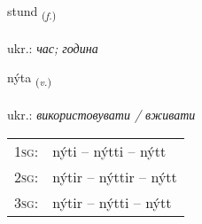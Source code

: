 \documentclass[frontgrid, backgrid]{flacards}\usepackage[]{graphicx}\usepackage[]{xcolor}
\begin{document}
\renewcommand{\flhead}{\vskip5pt \fboxsep=0pt {\small\bfseries\footnotesize Nafnorð | іменник}}
\renewcommand{\fcfoot}{\vskip5pt \fboxsep=0pt \hspace{2pt}{\small\bfseries\footnotesize 1K}}

\renewcommand{\blhead}{\vskip5pt {\small\bfseries\footnotesize Nafnorð | іменник }}
\renewcommand{\bcfoot}{\vskip5pt \hspace{2pt}{\small\bfseries\footnotesize 1K}}


{stund \small{\textsubscript{(\textit{f.})}} \\[1ex] %
\textphonetic{[stʏnt]} \\
ukr.: \emph{час; година} \\  [2ex]
\renewcommand*{\arraystretch}{0.8}
}

\renewcommand{\flhead}{\vskip5pt \fboxsep=0pt {\small\bfseries\footnotesize Sagnorð | дієслово}}
\renewcommand{\fcfoot}{\vskip5pt \fboxsep=0pt \hspace{2pt}{\small\bfseries\footnotesize 1K}}

\renewcommand{\blhead}{\vskip5pt {\small\bfseries\footnotesize Sagnorð | дієслово }}
\renewcommand{\bcfoot}{\vskip5pt \hspace{2pt}{\small\bfseries\footnotesize 1K}}


{nýta \small{\textsubscript{(\textit{v.})}} \\[1ex] %
\textphonetic{[niːta]} \\
ukr.: \emph{використовувати / вживати} \\  [2ex]
\renewcommand*{\arraystretch}{0.8}
\begin{tabular}{p{1cm}l}
\textsc{1sg}: & nýti -- nýtti -- nýtt \\ 
\textsc{2sg}: & nýtir -- nýttir -- nýtt \\ 
\textsc{3sg}: & nýtir -- nýtti -- nýtt \\ 
\end{tabular}
}
\end{document}
